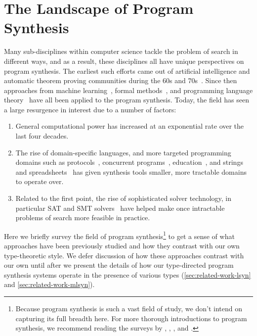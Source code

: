 \section{The Landscape of Program Synthesis}
\label{sec:the-landscape-of-program-synthesis}

Many sub-disciplines within computer science tackle the problem of search in different ways, and as a result, these disciplines all have unique perspectives on program synthesis.
The earliest such efforts came out of artificial intelligence and automatic theorem proving communities during the 60s and 70s~\citep{green-ijcai-1969, summers-popl-1976}.
Since then approaches from machine learning~\citep{lau-thesis-2001, briggs-kes-2008, weimer-icse-2009}, formal methods~\citep{srivastava-popl-2010, bodik-popl-2010, kuncak-pldi-2010}, and programming language theory~\citep{albarghouthi-cav-2013, gvero-pldi-2013, scherer-icfp-2015} have all been applied to the program synthesis.
Today, the field has seen a large resurgence in interest due to a number of factors:
\begin{enumerate}
  \item General computational power has increased at an exponential rate over the last four decades.~\citep{moore-electronics-1965}
  \item The rise of domain-specific languages, and more targeted programming domains such as protocols~\citep{alur-popl-2005, udupa-pldi-2013}, concurrent programs~\citep{solar-lezama-pldi-2008, cerny-cav-2011, prountzos-oopsla-2012}, education~\citep{singh-pldi-2013}, and strings and spreadsheets~\citep{gulwani-popl-2011} has given synthesis tools smaller, more tractable domains to operate over.
  \item Related to the first point, the rise of sophisticated solver technology, in particular SAT and SMT solvers~\citep{barrett-smt-2008} have helped make once intractable problems of search more feasible in practice.
\end{enumerate}
Here we briefly survey the field of program synthesis\footnote{%
  Because program synthesis is such a vast field of study, we don't intend on capturing its full breadth here.
  For more thorough introductions to program synthesis, we recommend reading the surveys by \citet{kreitz-automated-deduction-1998}, \citet{flener-jlp-1999}, \citet{gulwani-ppdp-2010}, and \citet{kitzelmann-aaip-2010}.
} to get a sense of what approaches have been previously studied and how they contrast with our own type-theoretic style.
We defer discussion of how these approaches contrast with our own until after we present the details of how our type-directed program synthesis systems operate in the presence of various types (\autoref{sec:related-work-lsyn} and \autoref{sec:related-work-mlsyn}).

